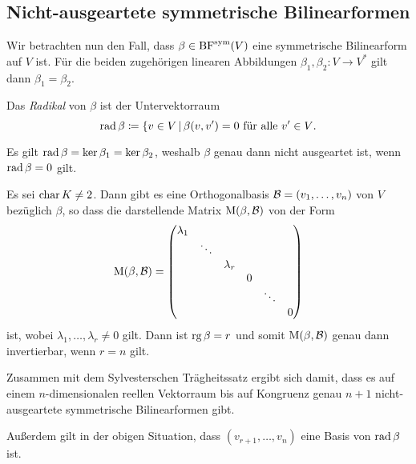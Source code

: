 \subsection{Nicht-ausgeartete symmetrische Bilinearformen}

Wir betrachten nun den Fall, dass $\beta \in \operatorname{BF}^{\operatorname{sym}}(V)$ eine symmetrische Bilinearform auf $V$ ist.
Für die beiden zugehörigen linearen Abbildungen $\beta_1, \beta_2 \colon V \to V^*$ gilt dann $\beta_1 = \beta_2$.

\begin{definition}
  Das \emph{Radikal} von $\beta$ ist der Untervektorraum
  \[
              \operatorname{rad} \beta
    \coloneqq \{v \in V \,|\, \text{$\beta(v,v') = 0$ für alle $v' \in V$}.
  \]
\end{definition}

Es gilt $\operatorname{rad} \beta = \ker \beta_1 = \ker \beta_2$, weshalb $\beta$ genau dann nicht ausgeartet ist, wenn $\operatorname{rad} \beta = 0$ gilt.

\begin{example}
  Es sei $\operatorname{char} K \neq 2$.
  Dann gibt es eine Orthogonalbasis $\mathcal{B} = (v_1, \dotsc, v_n)$ von $V$ bezüglich $\beta$, so dass die darstellende Matrix $\operatorname{M}(\beta, \mathcal{B})$ von der Form
  \[
      \operatorname{M}(\beta, \mathcal{B})
    = \begin{pmatrix}
        \lambda_1 &         &           &   &         &   \\
                  & \ddots  &           &   &         &   \\
                  &         & \lambda_r &   &         &   \\
                  &         &           & 0 &         &   \\
                  &         &           &   & \ddots  &   \\
                  &         &           &   &         & 0
      \end{pmatrix}
  \]
  ist, wobei $\lambda_1, \dotsc, \lambda_r \neq 0$ gilt.
  Dann ist $\operatorname{rg} \beta = r$ und somit $\operatorname{M}(\beta, \mathcal{B})$ genau dann invertierbar, wenn $r = n$ gilt.
  
  Zusammen mit dem Sylvesterschen Trägheitssatz ergibt sich damit, dass es auf einem $n$-dimensionalen reellen Vektorraum bis auf Kongruenz genau $n+1$ nicht-ausgeartete symmetrische Bilinearformen gibt.
  
  Außerdem gilt in der obigen Situation, dass $(v_{r+1}, \dotsc, v_n)$ eine Basis von $\operatorname{rad} \beta$ ist.
\end{example}

